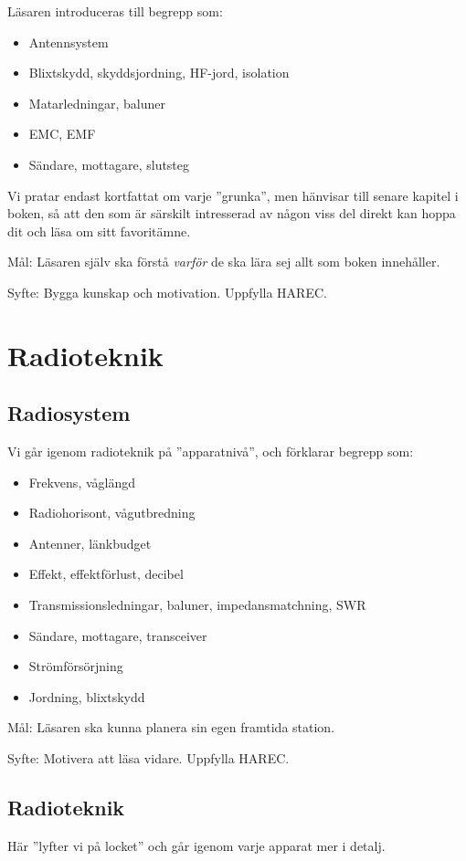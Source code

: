 \documentclass[a4paper,twoside,openright]{book}
\begin{document}
Läsaren introduceras till begrepp som:
\begin{itemize}
\item Antennsystem
\item Blixtskydd, skyddsjordning, HF-jord, isolation
\item Matarledningar, baluner
\item EMC, EMF
\item Sändare, mottagare, slutsteg
\end{itemize}

Vi pratar endast kortfattat om varje ''grunka'', men hänvisar till
senare kapitel i boken, så att den som är särskilt intresserad av
någon viss del direkt kan hoppa dit och läsa om sitt favoritämne.

Mål: Läsaren själv ska förstå \emph{varför} de ska lära sej allt som
boken innehåller.

Syfte: Bygga kunskap och motivation. Uppfylla HAREC.

\part{Radioteknik}

\chapter{Radiosystem}
Vi går igenom radioteknik på ''apparatnivå'', och förklarar begrepp som:
\begin{itemize}
\item Frekvens, våglängd
\item Radiohorisont, vågutbredning
\item Antenner, länkbudget
\item Effekt, effektförlust, decibel
\item Transmissionsledningar, baluner, impedansmatchning, SWR
\item Sändare, mottagare, transceiver
\item Strömförsörjning
\item Jordning, blixtskydd
\end{itemize}

Mål: Läsaren ska kunna planera sin egen framtida station.

Syfte: Motivera att läsa vidare. Uppfylla HAREC.

\chapter{Radioteknik}
\label{radioteknik}
Här ''lyfter vi på locket'' och går igenom varje apparat mer i detalj.
\end{document}
